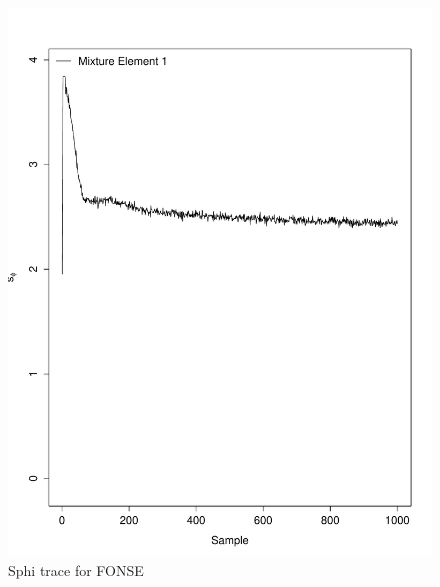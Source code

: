 \documentclass[11pt]{labbook}
\begin{document}
    \begin{figure}
        \centering
        \includegraphics[scale=.65]{FONSE_Plots/2016/June_27/Run1_SphiTrace}
        \caption{Sphi trace for FONSE}
        \label{fig:JUN27_FSPHI}
    \end{figure}
\end{document}

